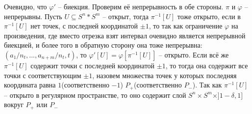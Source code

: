 \documentclass{article}
\begin{document}
\begin{enumerate}
        Очевидно, что $\varphi'$ – биекция. Проверим её непрерывность в обе
        стороны. $\pi$ и $\varphi$ – непрерывны. Пусть $U\subseteq S^n*S^m$ –
        открыт, тогда $\pi^{-1}[U]$ тоже открыто, если в $\pi^{-1}[U]$ нет
        точек, с последней координатой $\pm1$, то так как ограничение $\varphi$
        на произведения, где вместо отрезка взят интервал очевидно является
        непрерывной биекцией, и более того в обратную сторону она тоже непрерывна:
        $(a_1/n_t,...,a_{n+m}/n_t,t)$, то $\varphi'[U]=\varphi[\pi^{-1}[U]]$ –
        открыто. Если всё же $\pi^{-1}[U]$ содержит точки с последней
        координатой $\pm1$, то тогда она содержит все точки с соответствующим
        $\pm1$, назовем множества точек у которых последняя координата равна
        $1$(соответственно $-1$) $P_+$(соответственно $P_-$). Так как
        $\pi^{-1}[U]$ – открыто в регулярном пространстве, то оно содержит слой
        $S^n\times S^m\times]1-\delta,1]$
        вокруг $P_+$ или $P_-$ 

\end{enumerate}
\end{document}
